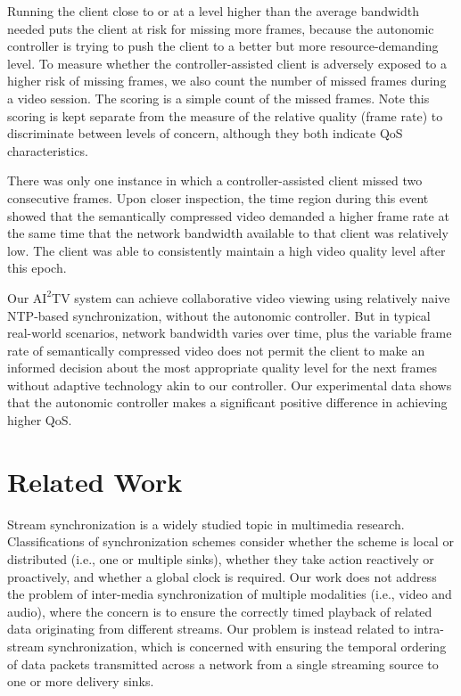\documentclass{sig-alternate}
\begin{document}

Running the client close to or at a level higher than the average
bandwidth needed puts the client at risk for missing more frames,
because the autonomic controller is trying to push the client to a
better but more resource-demanding level.  To measure whether the
controller-assisted client is adversely exposed to a higher risk of
missing frames, we also count the number of missed frames during a
video session.  The scoring is a simple count of the missed frames.
Note this scoring is kept separate from the measure of the relative
quality (frame rate) to discriminate between levels of concern,
although they both indicate QoS characteristics.

There was only one instance in which a controller-assisted client
missed two consecutive frames.  Upon closer inspection, the time
region during this event showed that the semantically compressed video
demanded a higher frame rate at the same time that the network
bandwidth available to that client was relatively low.  The client was
able to consistently maintain a high video quality level after this
epoch.


Our $\mathrm{AI}^2$TV system can achieve collaborative video viewing
using relatively naive NTP-based synchronization, without the
autonomic controller. But in typical real-world scenarios, network
bandwidth varies over time, plus the variable frame rate of
semantically compressed video does not permit the client to make an
informed decision about the most appropriate quality level for the
next frames without adaptive technology akin to our controller.  Our
experimental data shows that the autonomic controller makes a
significant positive difference in achieving higher QoS.

\section{Related Work} \label{related}

Stream synchronization is a widely studied topic in multimedia
research. Classifications of synchronization schemes consider whether
the scheme is local or distributed (i.e., one or multiple sinks),
whether they take action reactively or proactively, and whether a
global clock is required.  Our work does not address the problem of
inter-media synchronization of multiple modalities (i.e., video and
audio), where the concern is to ensure the correctly timed playback of
related data originating from different streams.  Our problem is
instead related to intra-stream synchronization, which is concerned
with ensuring the temporal ordering of data packets transmitted across
a network from a single streaming source to one or more delivery sinks.
\end{document}
